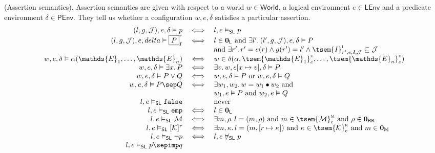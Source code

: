 \begin{defn}
	(Assertion semantics).
	Assertion semantics are given with respect to a world $w \in \mathsf{World}$, a logical environment $e \in \mathsf{LEnv}$ and a predicate environment $\delta \in \mathsf{PEnv}$. They tell us whether a configuration $w, e, \delta$ satisfies a particular assertion.
	\begingroup
	\renewcommand*{\arraystretch}{1.5}
	\[
	\begin{array}{r c l}
		(l, g, \mathcal{J}), e, \delta \vDash p
		&
		\iff
		&
		l, e \vDash_\mathsf{SL} p
	\\
		(l, g, \mathcal{J}), e, delta \vDash \boxed{P}_I^r
		&
		\iff
		&
		l \in \mathbf{0}_\mathsf{L} \text{ and } \exists l' \ldotp (l', g, \mathcal{J}), e, \delta \vDash P
		\\ && \text{and } \exists r' \ldotp r' = e(r) \land g(r') = l' \land \tsem{I}^\textsc{i}_{r', e, \delta, \mathcal{J}} \subseteq \mathcal{J}
	\\
		w, e, \delta \vDash \alpha(\mathds{E}_1, \ldots, \mathds{E}_n)
		&
		\iff
		&
		w \in \delta(\alpha, \tsem{\mathds{E}_1}_e^\textsc{e}, \ldots, \tsem{\mathds{E}_n}_e^\textsc{e})
	\\
		w, e, \delta \vDash \exists x \ldotp P
		&
		\iff
		&
		\exists v \ldotp w, e[x \mapsto v], \delta \vDash P
	\\
		w, e, \delta \vDash P \lor Q
		&
		\iff
		&
		w, e, \delta \vDash P \text{ or } w, e, \delta \vDash Q
	\\
		w, e, \delta \vDash P \sep Q
		&
		\iff
		&
		\exists w_1, w_2 \ldotp w = w_1 \bullet w_2 \text{ and } \\ && w_1, e \vDash P \text{ and } w_2, e \vDash Q
	\\
		l, e \vDash_\mathsf{SL} \mathtt{false}
		&&
		\text{never}
	\\
		l, e \vDash_\mathsf{SL}  \mathtt{emp}
		&
		\iff
		&
		l \in \mathbf{0}_\mathsf{L}
	\\
		l, e \vDash_\mathsf{SL} \mathcal{M}
		&
		\iff
		&
		\exists m, \rho \ldotp l = (m, \rho) \text{ and } m \in \tsem{\mathcal{M}}_e^\textsc{m} \text{ and } \rho \in \mathbf{0}_\mathsf{RK}
	\\
		l, e \vDash_\mathsf{SL} [\mathcal{K}]^r
		&
		\iff
		&
		\exists m, \kappa \ldotp l = (m, [r \mapsto \kappa]) \text{ and } \kappa \in \tsem{\mathcal{K}}_e^\textsc{k} \text{ and } m \in \mathbf{0}_\mathbb{M}
	\\
		l, e \vDash_\mathsf{SL} \lnot p
		&
		\iff
		&
		l, e \not\vDash_\mathsf{SL} p
	\\
		l, e \vDash_\mathsf{SL} p \sepimp q

\end{array}\]
\end{defn}
